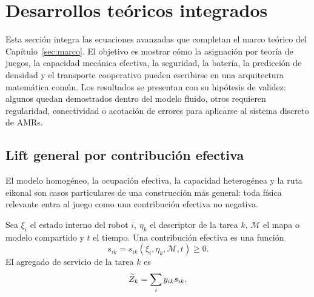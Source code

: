 \section{Desarrollos teóricos integrados}
\label{sec:desarrollos-teoricos-integrados}
\label{sec:anexo-teorico-extendido}

Esta sección integra las ecuaciones avanzadas que completan el marco teórico del
Capítulo~\ref{sec:marco}. El objetivo es mostrar cómo la asignación por teoría de
juegos, la capacidad mecánica efectiva, la seguridad, la batería, la predicción de
densidad y el transporte cooperativo pueden escribirse en una arquitectura matemática
común. Los resultados se presentan con su hipótesis de validez: algunos quedan
demostrados dentro del modelo fluido, otros requieren regularidad, conectividad o
acotación de errores para aplicarse al sistema discreto de AMRs.

\subsection{Lift general por contribución efectiva}
\label{subsec:lift-contribucion}

El modelo homogéneo, la ocupación efectiva, la capacidad heterogénea y la ruta eikonal
son casos particulares de una construcción más general: toda física relevante entra al
juego como una contribución efectiva no negativa.

\begin{definicion}
Sea $\xi_i$ el estado interno del robot $i$, $\eta_k$ el descriptor de la tarea $k$,
$\mathcal{M}$ el mapa o modelo compartido y $t$ el tiempo. Una contribución efectiva es
una función
\begin{equation}
  s_{ik}=s_{ik}(\xi_i,\eta_k,\mathcal{M},t)\ge0.
  \label{eq:anexo_s_general}
\end{equation}
El agregado de servicio de la tarea $k$ es
\begin{equation}
  \widetilde{Z}_k=\sum_i y_{ik}s_{ik}.
  \label{eq:anexo_Z_general}
\end{equation}
\end{definicion}

